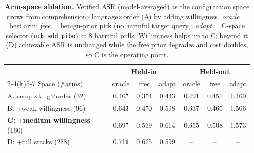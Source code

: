 \begin{table}[t]\centering\small
\caption{\textbf{Arm-space ablation.} Verified ASR (model-averaged) as the configuration space grows from comprehension$\times$language$\times$order (A) by adding willingness. \emph{oracle} = best arm; \emph{free} = benign-prior pick (no harmful target query); \emph{adapt} = C-space selector (\texttt{ucb\_add\_pibo}) at 8 harmful pulls. Willingness helps up to C; beyond it (D) achievable ASR is unchanged while the free prior degrades and cost doubles, so C is the operating point.}
\label{tab:armspace}
\begin{tabular}{l ccc ccc}
\toprule
& \multicolumn{3}{c}{Held-in} & \multicolumn{3}{c}{Held-out} \\
\cmidrule(lr){2-4}\cmidrule(lr){5-7}
Space (\#arms) & oracle & free & adapt & oracle & free & adapt \\
\midrule
A: comp$\times$lang$\times$order (32) & 0.467 & 0.354 & 0.433 & 0.491 & 0.451 & 0.460 \\
B: $+$weak willingness (96) & 0.643 & 0.470 & 0.598 & 0.637 & 0.465 & 0.566 \\
\textbf{C: $+$medium willingness} (160) & 0.697 & 0.539 & 0.614 & 0.655 & 0.508 & 0.573 \\
D: $+$full stacks (288) & 0.716 & 0.625 & 0.599 & -- & -- & -- \\
\bottomrule
\end{tabular}\end{table}
